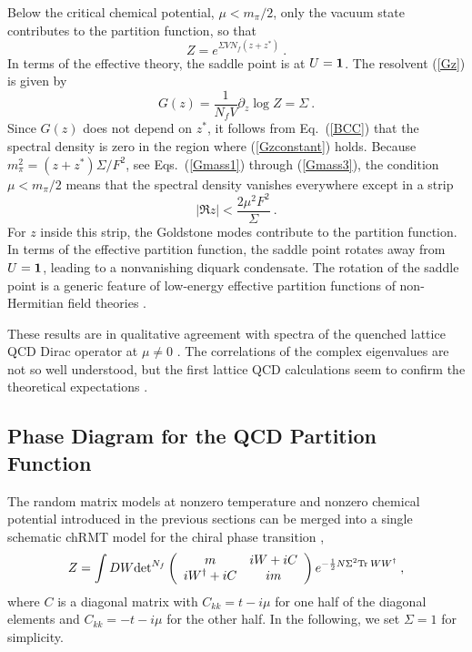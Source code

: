 Below the critical chemical potential, $\mu < m_\pi/2$, only the
vacuum state contributes to the partition function, so that
\begin{equation}
  Z = e^{\Sigma V N_f(z+z^*)}\:.
\end{equation}
In terms of the effective theory, the saddle point is at $U =\bf 1$.  The
resolvent (\ref{Gz}) is given by
\begin{equation}
  \label{Gzconstant}
  G(z) = \frac 1{N_f V} \partial_{z} \log Z = \Sigma\:.
\end{equation}
Since $G(z)$ does not depend on $z^*$, it follows from Eq.~(\ref{BCC})
that the spectral density is zero in the region where
(\ref{Gzconstant}) holds.  Because $m_\pi^2=(z+z^*)\Sigma/F^2$, see
Eqs.~(\ref{Gmass1}) through (\ref{Gmass3}), the condition $\mu <
m_\pi/2$ means that the spectral density vanishes everywhere except in
a strip
\begin{equation}
  |\Re z| < \frac{2\mu^2 F^2}\Sigma\:.
\end{equation}
For $z$ inside this strip, the Goldstone modes contribute to the
partition function.  In terms of the effective partition function, the
saddle point rotates away from $U=\bf 1$, leading to a nonvanishing diquark
condensate.  The rotation of the saddle point is a generic feature of
low-energy effective partition functions of non-Hermitian field theories
\cite{supernonh,Efetovnh,KST,KSTVZ,efetovrot}.

These results are in qualitative agreement with spectra of the
quenched lattice QCD Dirac operator at $\mu \ne 0$ \cite{everybody}.
The correlations of the complex eigenvalues are not so well
understood, but the first lattice QCD calculations \cite{Tilomu} seem
to confirm the theoretical expectations
\cite{Ginibre,fyodorov,fyodorovpoly,Forrestc}.



\subsection{Phase Diagram for the QCD Partition Function}

The random matrix models at nonzero temperature and nonzero chemical
potential introduced in the previous sections can be merged into a
single schematic chRMT model for the chiral phase transition
\cite{phase},
\begin{equation}
  Z = \int DW {\det}^{N_f} \left ( \begin{array}{cc} m & iW + iC\\
      iW^\dagger +iC& im \end{array}\right )
  e^{-\frac12N\Sigma^2{\rm Tr\:} WW^\dagger}\:,
  \label{Zmut}
\end{equation}
where $C$ is a diagonal matrix with $C_{kk}= t -i\mu$ for one half of the
diagonal elements and $C_{kk}=-t-i\mu$ for the other half.  In the
following, we set $\Sigma=1$ for simplicity.

